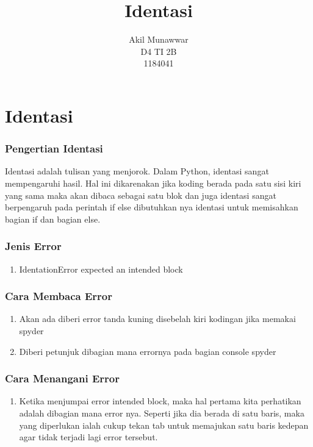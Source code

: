 \documentclass{article}
\begin{document}
\title{Identasi}
\author{Akil Munawwar \\ D4 TI 2B \\ 1184041}
\maketitle

\part{Identasi}
\section{Pengertian Identasi}
Identasi adalah tulisan yang menjorok. Dalam Python, identasi sangat mempengaruhi hasil. Hal ini dikarenakan jika koding berada pada satu sisi kiri yang sama maka akan dibaca sebagai satu blok dan juga identasi sangat berpengaruh pada perintah if else dibutuhkan nya identasi untuk memisahkan bagian if dan bagian else.
\section{Jenis Error}
\begin{enumerate}
\item IdentationError expected an intended block
\end{enumerate}
\section{Cara Membaca Error}
\begin{enumerate}
\item Akan ada diberi error tanda kuning disebelah kiri kodingan jika memakai spyder
\item Diberi petunjuk dibagian mana errornya pada bagian console spyder
\end{enumerate}
\section{Cara Menangani Error}
\begin{enumerate}
\item Ketika menjumpai error intended block, maka hal pertama kita perhatikan adalah dibagian mana error nya. Seperti jika dia berada di satu baris, maka yang diperlukan ialah cukup tekan tab untuk memajukan satu baris kedepan agar tidak terjadi lagi error tersebut.
\end{enumerate}
\end{document}
